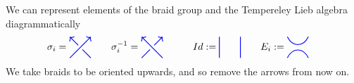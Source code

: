 \documentclass{amsart}
\newcommand{\hackcenter}[1]{
 \xy (0,0)*{#1}; \endxy}
\theoremstyle{plain}
\theoremstyle{definition}
\newtheorem{definition}[theorem]{Definition}
\theoremstyle{definition}
\numberwithin{equation}{section}
\numberwithin{theorem}{section}
\numberwithin{equation}{section}
\begin{document}
We can represent elements of the braid group and the Tempereley Lieb algebra diagrammatically
\begin{align*}
\sigma_i=
\hackcenter{ \begin{tikzpicture} [scale=.75]
\draw[thick,   blue, ->] (0,0) to (1,1);
\draw[thick,   blue  ] (1,0) to (.6,.4);
\draw[thick,   blue, <-] (0,1) to (.4,.6);
\end{tikzpicture}}& \qquad
\sigma_i^{-1}=
\hackcenter{ \begin{tikzpicture} [xscale=-1,scale=.75]
\draw[thick,   blue, ->] (0,0) to (1,1);
\draw[thick,   blue] (1,0) to (.6,.4);
\draw[thick,   blue, <-] (0,1) to (.4,.6);
\end{tikzpicture}} & \qquad
  Id:=
\hackcenter{ \begin{tikzpicture} [scale=.75]
\draw[thick,   blue] (0,0) to (0,1);
\draw[thick,   blue] (1,0) to (1,1);
\end{tikzpicture}} & \qquad E_i:=
\hackcenter{ \begin{tikzpicture} [scale=.75]
\draw[thick,   blue] (0,0).. controls ++(.25,.5) and ++(-.25,.5).. (1,0);
\draw[thick,   blue] (0,1).. controls ++(.25,-.5) and ++(-.25,-.5).. (1,1);
\end{tikzpicture}}
\end{align*}
We take braids to be oriented upwards, and so remove the arrows from now on.

\end{document}

